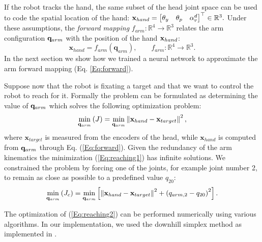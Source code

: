 If the robot tracks the hand, the same subset of the head joint space 
can be used to code the spatial location of the hand: $
\mathbf{x}_{hand}=
\begin{bmatrix} \theta_y & \theta_p & \alpha_v^d\end{bmatrix}^\top \in \mathbb R^3.
$
%
Under these assumptions, the \emph{forward mapping} 
$f_{arm} : \mathbb R^4 \longrightarrow \mathbb R^3$
relates the arm configuration $\mathbf q_{arm}$ with the position of the hand 
$\mathbf{x}_{hand}$:
%
\begin{equation} 
\label{Eq:forward}
\mathbf x_{hand}=f_{arm}(\mathbf q_{arm}), \qquad f_{arm} : \mathbb R^4 \longrightarrow \mathbb R^3.\end{equation}
%
In the next section we show how we trained a neural network to approximate
the arm forward mapping (Eq. \ref{Eq:forward}).

Suppose now that the robot is fixating a target and that we want to control 
the robot to reach for it. Formally the problem can be formulated 
as determining the value of $\mathbf q_{arm}$ which solves the 
following optimization problem:
%
\begin{equation} 
\label{Eq:reaching1}
  \displaystyle\min_{\mathbf q_{arm}} \left(J\right)=\displaystyle\min_{\mathbf q_{arm}}
  \left\|\mathbf x_{hand} - \mathbf x_{target}\right\|^2,
\end{equation}
%
where $\mathbf x_{target}$ is measured from the encoders of the head, while 
$\mathbf x_{hand}$ is computed from $\mathbf q_{arm}$ through Eq. (\ref{Eq:forward}).
Given the redundancy of the arm kinematics the minimization 
(\ref{Eq:reaching1}) has infinite solutions. We constrained the problem by 
forcing one of the joints, for example joint number 2, to remain as close 
as possible to a predefined value $q_{20}$:
%
\begin{equation} 
\label{Eq:reaching2}
  \displaystyle\min_{\mathbf q_{arm}}\left(J_c\right)=\displaystyle\min_{\mathbf q_{arm}}
  \left[
  \left\|\mathbf x_{hand} - \mathbf x_{target}\right\|^2 + \left(q_{arm,2}-q_{20}\right)^2
  \right].
\end{equation}

The optimization of (\ref{Eq:reaching2}) can be performed numerically using 
various algorithms. In our implementation, we used 
the downhill simplex method \cite{ne:Computer:65} as implemented in 
\cite{mo:Press:90}.

